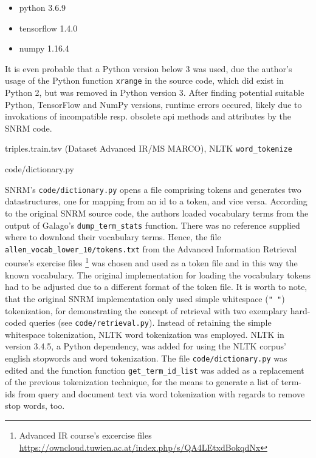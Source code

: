 \begin{itemize}
    \item python 3.6.9
    \item tensorflow 1.4.0
    \item numpy 1.16.4
\end{itemize}

It is even probable that a Python version below 3 was used, due the author's usage of the Python 
    function \texttt{xrange} in the source code, which did exist in Python 2, but was removed in Python version 3.
After finding potential suitable Python, TensorFlow and NumPy versions, runtime errors occured, likely due to invokations of incompatible 
    resp. obsolete api methods and attributes by the SNRM code.



triples.train.tsv (Dataset Advanced IR/MS MARCO), NLTK \verb|word_tokenize|




code/dictionary.py




SNRM's \texttt{code/dictionary.py} opens a file comprising tokens and generates two datastructures, one for mapping from an id to a token, 
    and vice versa.
According to the original SNRM source code, the authors loaded vocabulary terms from the output of Galago's \verb|dump_term_stats| function.
There was no reference supplied where to download their vocabulary terms.
Hence, the file \verb|allen_vocab_lower_10/tokens.txt| from the Advanced Information Retrieval course's exercise files 
    \footnote{Advanced IR course's excercise files \url{https://owncloud.tuwien.ac.at/index.php/s/QA4LEtxdBokqdNx}}
    was chosen and used as a token file and in this way the known vocabulary.
The original implementation for loading the vocabulary tokens had to be adjusted due to a different format of the token file.
It is worth to note, that the original SNRM implementation only used simple whitespace (\verb|" "|) tokenization, for demonstrating
    the concept of retrieval with two exemplary hard-coded queries (see \texttt{code/retrieval.py}).
Instead of retaining the simple whitespace tokenization, NLTK word tokenization was employed.
NLTK in version 3.4.5, a Python dependency, was added for using the NLTK corpus' english stopwords and word tokenization.
The file \texttt{code/dictionary.py} was edited and the function function \verb|get_term_id_list| was added as a 
    replacement of the previous tokenization technique, for the means to generate a list of term-ids from 
    query and document text via word tokenization with regards to remove stop words, too.



